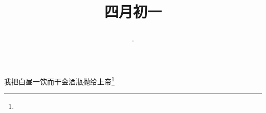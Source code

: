 \title{\date[d=8,m=5,y=2024][year:cn-y,年,month:cn,day:cn,日,·,weekday]·四月初一 }
我把白昼一饮而干金酒瓶抛给上帝\footnote{ }

